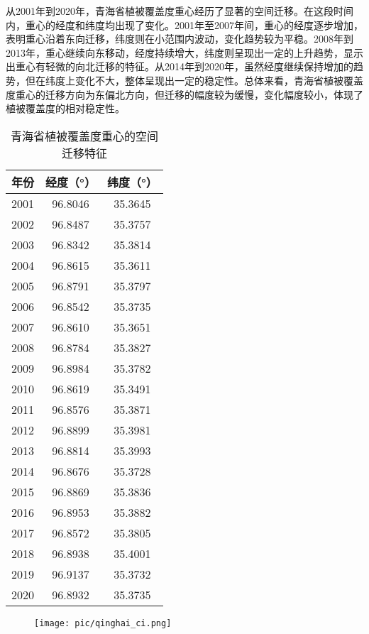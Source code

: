 \documentclass{article}
\begin{document}
		
		\par
		从2001年到2020年，青海省植被覆盖度重心经历了显著的空间迁移。在这段时间内，重心的经度和纬度均出现了变化。2001年至2007年间，重心的经度逐步增加，表明重心沿着东向迁移，纬度则在小范围内波动，变化趋势较为平稳。2008年到2013年，重心继续向东移动，经度持续增大，纬度则呈现出一定的上升趋势，显示出重心有轻微的向北迁移的特征。从2014年到2020年，虽然经度继续保持增加的趋势，但在纬度上变化不大，整体呈现出一定的稳定性。总体来看，青海省植被覆盖度重心的迁移方向为东偏北方向，但迁移的幅度较为缓慢，变化幅度较小，体现了植被覆盖度的相对稳定性。
	\begin{table}[H]
			\centering
		\begin{tabular}{|c|c|c|}
			\hline
			年份 & 经度（°） & 纬度（°） \\
			\hline
			2001 & 96.8046 & 35.3645 \\
			2002 & 96.8487 & 35.3757 \\
			2003 & 96.8342 & 35.3814 \\
			2004 & 96.8615 & 35.3611 \\
			2005 & 96.8791 & 35.3797 \\
			2006 & 96.8542 & 35.3735 \\
			2007 & 96.8610 & 35.3651 \\
			2008 & 96.8784 & 35.3827 \\
			2009 & 96.8984 & 35.3782 \\
			2010 & 96.8619 & 35.3491 \\
			2011 & 96.8576 & 35.3871 \\
			2012 & 96.8899 & 35.3981 \\
			2013 & 96.8814 & 35.3993 \\
			2014 & 96.8676 & 35.3728 \\
			2015 & 96.8869 & 35.3836 \\
			2016 & 96.8953 & 35.3882 \\
			2017 & 96.8572 & 35.3805 \\
			2018 & 96.8938 & 35.4001 \\
			2019 & 96.9137 & 35.3732 \\
			2020 & 96.8932 & 35.3735 \\
			\hline
		\end{tabular}
		
		
		
		
		
				\caption{青海省植被覆盖度重心的空间迁移特征}
		\end{table}
		\begin{figure}[H]  %
			\centering
			\texttt{[image: pic/qinghai\_ci.png]} %
		\end{figure}
		
\end{document}
